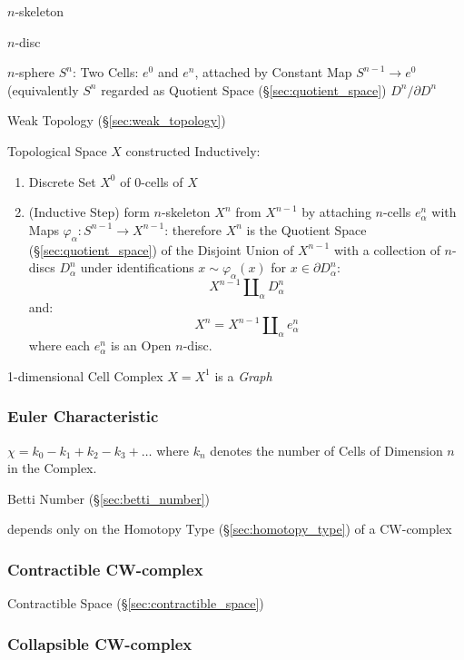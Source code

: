 $n$-skeleton

$n$-disc

$n$-sphere $S^n$: Two Cells: $e^0$ and $e^n$, attached by Constant Map
$S^{n-1} \rightarrow e^0$ (equivalently $S^n$ regarded as Quotient
Space (\S\ref{sec:quotient_space}) $D^n/ \partial D^n$

Weak Topology (\S\ref{sec:weak_topology})

Topological Space $X$ constructed Inductively: \cite{hatcher02}
\begin{enumerate}
  \item Discrete Set $X^0$ of $0$-cells of $X$
  \item (Inductive Step) form $n$-skeleton $X^n$ from $X^{n-1}$ by
    attaching $n$-cells $e^n_\alpha$ with Maps $\varphi_\alpha :
    S^{n-1} \rightarrow X^{n-1}$: therefore $X^n$ is the Quotient
    Space (\S\ref{sec:quotient_space}) of the Disjoint Union of
    $X^{n-1}$ with a collection of $n$-discs $D^n_\alpha$ under
    identifications $x \sim \varphi_\alpha(x)$ for $x \in \partial
    D^n_\alpha$:
    \[
      X^{n-1}\amalg_\alpha D^n_\alpha
    \]
    and:
    \[
      X^n = X^{n-1}\amalg_\alpha e^n_\alpha
    \]
    where each $e^n_\alpha$ is an Open $n$-disc.
\end{enumerate}

1-dimensional Cell Complex $X = X^1$ is a \emph{Graph}



\subsubsection{Euler Characteristic}\label{sec:euler_characteristic}

$\chi = k_0 - k_1 + k_2 - k_3 + \ldots$ where $k_n$ denotes the number
of Cells of Dimension $n$ in the Complex.

Betti Number (\S\ref{sec:betti_number})

depends only on the Homotopy Type (\S\ref{sec:homotopy_type}) of a
CW-complex \cite{hatcher02}



\subsubsection{Contractible CW-complex}
\label{sec:contractible_cwcomplex}

Contractible Space (\S\ref{sec:contractible_space})



\subsubsection{Collapsible CW-complex}
\label{sec:collapsible_cwcomplex}

